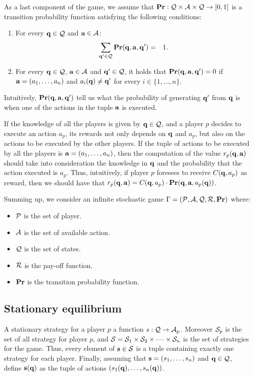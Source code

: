As a last component of the game, we assume that $\mathbf{Pr} : \mathcal{Q} \times \mathcal{A} \times \mathcal{Q} \to [0,1]$ is a transition probability function satisfying the following conditions:
\begin{enumerate}
\item For every $\mathbf{q} \in \mathcal{Q}$ and $\mathbf{a} \in \mathcal{A}$:
\begin{eqnarray*}
\sum_{\mathbf{q}' \in \mathcal{Q}} \mathbf{Pr}(\mathbf{q}, \mathbf{a}, \mathbf{q}' ) & = & 1.
\end{eqnarray*}

\item For every $\mathbf{q} \in \mathcal{Q}$, $\mathbf{a} \in \mathcal{A}$ and $\mathbf{q}' \in \mathcal{Q}$, it holds that $\mathbf{Pr}(\mathbf{q}, \mathbf{a}, \mathbf{q}') = 0$ if $\mathbf{a} = (a_1, \ldots, a_n)$ and $a_i(\mathbf{q}) \neq \mathbf{q}'$ for every $i \in \{1, \ldots, n\}$.
\end{enumerate}
Intuitively, $\mathbf{Pr}(\mathbf{q}, \mathbf{a}, \mathbf{q}')$ tell us what the probability of generating $\mathbf{q}'$ from $\mathbf{q}$ is when one of the actions in the tuple $\mathbf{a}$ is executed.

If the knowledge of all the players is given by $\mathbf{q} \in \mathcal{Q}$, and a player $p$ decides to execute an action $a_p$, its rewards not only depends on $\mathbf{q}$ and $a_p$, but also on the actions to be executed by the other players. If the tuple of actions to be executed by all the players is $\mathbf{a} = (a_1, \ldots, a_n)$, then the computation of the value $r_p(\mathbf{q}, \mathbf{a})$ should take into consideration the knowledge in $\mathbf{q}$ and the probability that the action executed is $a_p$. Thus, intuitively, if player $p$ foresees to receive $C(\mathbf{q}, a_p)$ as reward, then we should have that $r_p(\mathbf{q}, \mathbf{a}) = C(\mathbf{q}, a_p) \cdot \mathbf{Pr}(\mathbf{q}, \mathbf{a}, a_p(\mathbf{q}))$.

Summing up, we consider an infinite stochastic game $\Gamma = (\mathcal{P},\mathcal{A},\mathcal{Q},\mathcal{R},\mathbf{Pr})$ where:
\begin{itemize}
	\item $\mathcal{P}$ is the set of player.
	\item $\mathcal{A}$ is the set of available action.
	\item $\mathcal{Q}$ is the set of states.
	\item $\mathcal{R}$ is the pay-off function.
	\item $\mathbf{Pr}$ is the transition probability function.
\end{itemize} 


\subsection{Stationary equilibrium}
A stationary strategy for a player $p$ a function $s : \mathcal{Q} \rightarrow \mathcal{A}_p$. Moreover $\mathcal{S}_p$ is the set of all strategy for player $p$, and $\mathcal{S} = \mathcal{S}_{1} \times \mathcal{S}_{2} \times \cdots \times \mathcal{S}_{n}$ is the set of strategies for the game. Thus, every element of $\mathbf{s} \in \mathcal{S}$ is a tuple containing exactly one strategy for each player. Finally, assuming that $\mathbf{s} = (s_1, \ldots, s_n)$ and $\mathbf{q} \in \mathcal{Q}$, define $\mathbf{s}(\mathbf{q})$ as the tuple of actions $(s_1(\mathbf{q}), \ldots, s_n(\mathbf{q}))$. 

